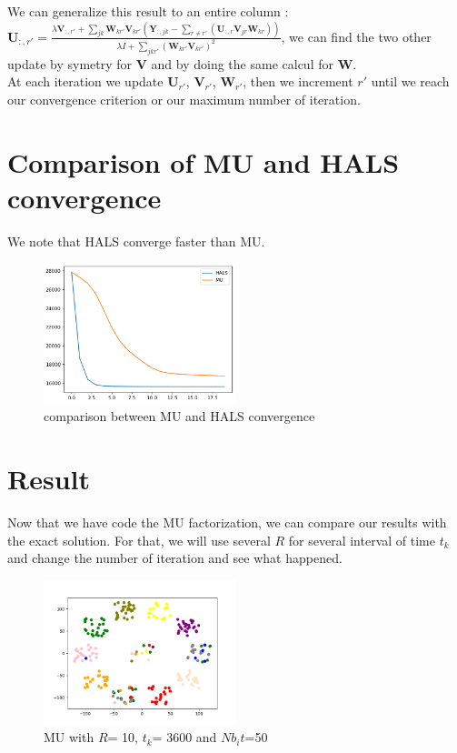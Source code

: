 \documentclass{article}
\begin{document}
We can generalize this result to an entire column : $\mathbf{U}_{:,r'} = \frac{\lambda \mathbf{V}_{:,r'} + \sum_{jk}\mathbf{W}_{kr'}\mathbf{V}_{kr'}(\mathbf{Y}_{:,jk}-\sum_{r \ne r'}(\mathbf{U}_{:,r}\mathbf{V}_{jr}\mathbf{W}_{kr}))}{\lambda I + \sum_{jkr'}(\mathbf{W}_{kr'}\mathbf{V}_{kr'})^2}$,
we can find the two other update by symetry for $\mathbf{V}$ and by doing the same calcul for $\mathbf{W}$.\\

At each iteration we update $\mathbf{U}_{r'}$, $\mathbf{V}_{r'}$, $\mathbf{W}_{r'}$,  then we increment $r'$ until we reach our convergence criterion or our maximum number of iteration.

\section{Comparison of MU and HALS convergence}

We note that HALS converge faster than MU.

\begin{figure}[h]
    \centering
    \includegraphics[width=0.5\textwidth]{images/comparison_HALS_MU.png}
    \caption{comparison between MU and HALS convergence}
\end{figure}



\section{Result}

Now that we have code the MU factorization, we can compare our results with the exact solution. 
For that, we will use several $R$ for several interval of time $t_{k}$ and change the number of iteration and see what happened. \\

\begin{figure}[h]
    \centering
    \includegraphics[width=0.5\textwidth]{images/MU50_R10_t3600.png}
    \caption{MU with $R$= 10, $t_{k}$= 3600 and $Nb_it$=50}
\end{figure}
\end{document}
